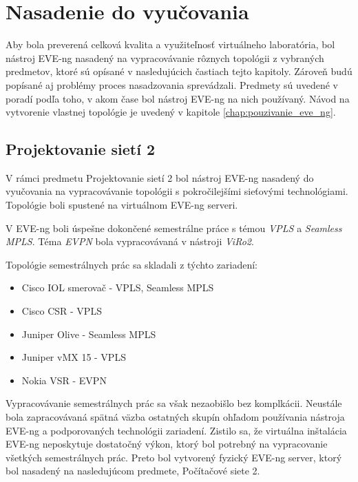 \chapter{Nasadenie do vyučovania}
\label{chap:nasadenie_do_vyucovania}

Aby bola preverená celková kvalita a využiteľnosť virtuálneho laboratória, bol nástroj EVE-ng nasadený na vypracovávanie rôznych topológii z vybraných predmetov, ktoré sú opísané v nasledujúcich častiach tejto kapitoly. Zároveň budú popísané aj problémy proces nasadzovania sprevádzali. Predmety sú uvedené v poradí podľa toho, v akom čase bol nástroj EVE-ng na nich používaný. Návod na vytvorenie vlastnej topológie je uvedený v kapitole \ref{chap:pouzivanie_eve_ng}.





\section{Projektovanie sietí 2}

V rámci predmetu Projektovanie sietí 2 bol nástroj EVE-ng nasadený do vyučovania na vypracovávanie topológii s pokročilejšími sieťovými technológiami. Topológie boli spustené na virtuálnom EVE-ng serveri.

V EVE-ng boli úspešne dokončené semestrálne práce s témou \emph{VPLS} a \emph{Seamless MPLS}. Téma \emph{EVPN} bola vypracovávaná v nástroji \emph{ViRo2}.

Topológie semestrálnych prác sa skladali z týchto zariadení:

\begin{itemize}[noitemsep]
    \item Cisco IOL smerovač - VPLS, Seamless MPLS
    \item Cisco CSR - VPLS
    \item Juniper Olive - Seamless MPLS
    \item Juniper vMX 15 - VPLS
    \item Nokia VSR - EVPN
\end{itemize}

Vypracovávanie semestrálnych prác sa však nezaobišlo bez komplkácii. Neustále bola zapracovávaná spätná väzba ostatných skupín ohľadom používania nástroja EVE-ng a podporovaných technológii zariadení. Zistilo sa, že virtuálna inštalácia EVE-ng neposkytuje dostatočný výkon, ktorý bol potrebný na vypracovanie všetkých semestrálnych prác. Preto bol vytvorený fyzický EVE-ng server, ktorý bol nasadený na nasledujúcom predmete, Počítačové siete 2.





